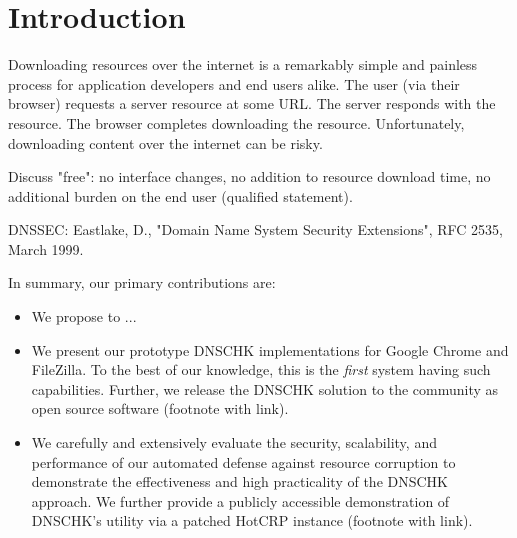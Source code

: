 \section{Introduction} \label{sec:introduction}

Downloading resources over the internet is a remarkably simple and painless
process for application developers and end users alike. The user (via their
browser) requests a server resource at some URL. The server responds with the
resource. The browser completes downloading the resource. Unfortunately,
downloading content over the internet can be risky.


Discuss "free": no interface changes, no addition to resource download time, no
additional burden on the end user (qualified statement).

DNSSEC: Eastlake, D., "Domain Name System Security Extensions", RFC 2535, March
1999.

In summary, our primary contributions are:

\begin{itemize}

  \item We propose to  ...

  \item We present our prototype DNSCHK implementations for Google Chrome and
  FileZilla. To the best of our knowledge, this is the \emph{first} system
  having such capabilities. Further, we release the DNSCHK solution to the
  community as open source software (footnote with link).

  \item We carefully and extensively evaluate the security, scalability, and
  performance of our automated defense against resource corruption to
  demonstrate the effectiveness and high practicality of the DNSCHK approach. We
  further provide a publicly accessible demonstration of DNSCHK's utility via a
  patched HotCRP instance (footnote with link).

\end{itemize}
